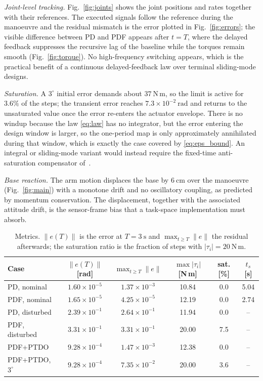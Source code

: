 \emph{Joint-level tracking.} Fig.~\ref{fig:joints} shows the joint positions
and rates together with their references. The executed signals follow the
reference during the manoeuvre and the residual mismatch is the error plotted
in Fig.~\ref{fig:errors}; the visible difference between PD and PDF appears
after $t=T$, where the delayed feedback suppresses the recursive lag of the
baseline while the torques remain smooth (Fig.~\ref{fig:torque}). No
high-frequency switching appears, which is the practical benefit of a
continuous delayed-feedback law over terminal sliding-mode designs.

\emph{Saturation.} A $3^\circ$ initial error demands about $37~\mathrm{N\,m}$,
so the limit is active for $3.6\%$ of the steps; the transient error reaches
$7.3\times10^{-2}~\mathrm{rad}$ and returns to the unsaturated value once the
error re-enters the actuator envelope. There is no windup because the law
\eqref{eq:law} has no integrator, but the error entering the design window is
larger, so the one-period map is only approximately annihilated during that
window, which is exactly the case covered by \eqref{eq:eps_bound}. An integral
or sliding-mode variant would instead require the fixed-time anti-saturation
compensator of~\cite{dou2025fractional}.

\emph{Base reaction.} The arm motion displaces the base by $6~\mathrm{cm}$ over
the manoeuvre (Fig.~\ref{fig:main}) with a monotone drift and no oscillatory
coupling, as predicted by momentum conservation. The displacement, together
with the associated attitude drift, is the sensor-frame bias that a task-space
implementation must absorb.

\begin{table}[!t]
\centering
\caption{Metrics. $\|e(T)\|$ is the error at $T=3~\mathrm{s}$ and
$\max_{t\ge T}\|e\|$ the residual afterwards; the saturation ratio is the
fraction of steps with $|\tau_i|=20~\mathrm{N\,m}$.}
\label{tab:results}
\scriptsize
\setlength{\tabcolsep}{1.5pt}
\begin{tabular}{lccccc}
\toprule
Case & $\|e(T)\|$ [rad] & $\max_{t\ge T}\|e\|$ & $\max|\tau_i|$ [N\,m] & sat. [\%] & $t_s$ [s]\\
\midrule
PD, nominal      & $1.60\times10^{-5}$ & $1.37\times10^{-3}$ & 10.84 & 0.0 & 5.04\\
PDF, nominal     & $1.65\times10^{-5}$ & $4.25\times10^{-5}$ & 12.19 & 0.0 & 2.74\\
PD, disturbed    & $2.39\times10^{-1}$ & $2.64\times10^{-1}$ & 11.94 & 0.0 & --\\
PDF, disturbed   & $3.31\times10^{-1}$ & $3.31\times10^{-1}$ & 20.00 & 7.5 & --\\
PDF+PTDO         & $9.28\times10^{-4}$ & $1.47\times10^{-3}$ & 12.38 & 0.0 & --\\
PDF+PTDO, $3^\circ$ & $9.28\times10^{-4}$ & $7.35\times10^{-2}$ & 20.00 & 3.6 & --\\
\bottomrule
\end{tabular}
\end{table}

